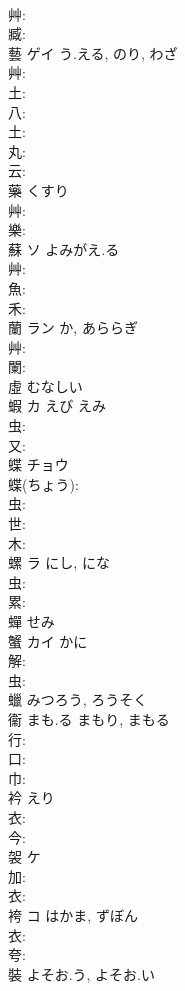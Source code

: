 \documentclass[8pt]{extreport}
\begin{document}
\begin{CJK}{UTF8}{min}
\\	艸: 
\\	臧: 
\\	藝	ゲイ	う.える, のり, わざ		
\\	艸: 
\\	土: 
\\	八: 
\\	土: 
\\	丸: 
\\	云: 
\\	藥		くすり				
\\	艸: 
\\	樂: 
\\	蘇	ソ	よみがえ.る		
\\	艸: 
\\	魚: 
\\	禾: 
\\	蘭	ラン		か, あららぎ	
\\	艸: 
\\	闌: 
\\	虛		むなしい				
\\	蝦	カ	えび	えみ	
\\	虫: 
\\	又: 
\\	蝶	チョウ			
\\	蝶(ちょう): 
\\	虫: 
\\	世: 
\\	木: 
\\	螺	ラ	にし, にな		
\\	虫: 
\\	累: 
\\	蟬		せみ				
\\	蟹	カイ	かに		
\\	解: 
\\	虫: 
\\	蠟		みつろう, ろうそく				
\\	衞		まも.る	まもり, まもる			
\\	行: 
\\	口: 
\\	巾: 
\\	衿		えり			
\\	衣: 
\\	今: 
\\	袈	ケ			
\\	加: 
\\	衣: 
\\	袴	コ	はかま, ずぼん		
\\	衣: 
\\	夸: 
\\	裝		よそお.う, よそお.い				

\end{CJK}
\end{document}
